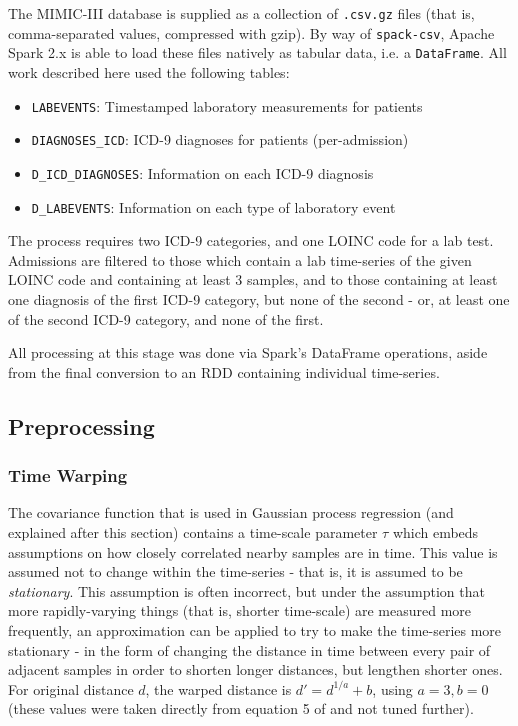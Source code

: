 \documentclass[journal]{IEEEtran}
\begin{document}

The MIMIC-III database is supplied as a collection of \texttt{.csv.gz}
files (that is, comma-separated values, compressed with gzip).  By way
of \texttt{spack-csv}, Apache Spark 2.x is able to load these files
natively as tabular data, i.e. a \texttt{DataFrame}.  All work
described here used the following tables\cite{Johnson2016a}:

\begin{itemize}
\item \texttt{LABEVENTS}: Timestamped laboratory measurements for patients
\item \texttt{DIAGNOSES\_ICD}: ICD-9 diagnoses for patients (per-admission)
\item \texttt{D\_ICD\_DIAGNOSES}: Information on each ICD-9 diagnosis
\item \texttt{D\_LABEVENTS}: Information on each type of laboratory event
\end{itemize}


The process requires two ICD-9 categories, and one LOINC code for a
lab test.  Admissions are filtered to those which contain a lab
time-series of the given LOINC code and containing at least 3 samples,
and to those containing at least one diagnosis of the first ICD-9
category, but none of the second - or, at least one of the second
ICD-9 category, and none of the first.

All processing at this stage was done via Spark's DataFrame
operations, aside from the final conversion to an RDD containing
individual time-series.

\subsection{Preprocessing}

\subsubsection{Time Warping}

The covariance function that is used in Gaussian process regression
(and explained after this section) contains a time-scale parameter
$\tau$ which embeds assumptions on how closely correlated nearby
samples are in time.  This value is assumed not to change within the
time-series - that is, it is assumed to be
\textit{stationary}\cite{Lasko2013}.  This assumption is often
incorrect, but under the assumption that more rapidly-varying things
(that is, shorter time-scale) are measured more frequently, an
approximation can be applied to try to make the time-series more
stationary - in the form of changing the distance in time between
every pair of adjacent samples in order to shorten longer distances,
but lengthen shorter ones\cite{Lasko2013}.  For original distance $d$,
the warped distance is $d'=d^{1/a}+b$, using $a=3, b=0$ (these
values were taken directly from equation 5 of \cite{Lasko2013} and not
tuned further).
\end{document}
